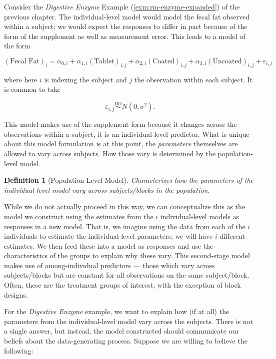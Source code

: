 \documentclass[
]{book}
\theoremstyle{plain}
\theoremstyle{mydefn}
\newtheorem{definition}{Definition}[chapter]
\theoremstyle{myexmpl}
\theoremstyle{remark}
\begin{document}
Consider the \emph{Digestive Enzyme} Example (\ref{exm:rm-enzyme-expanded}) of the previous chapter. The individual-level model would model the fecal fat observed within a subject; we would expect the responses to differ in part because of the form of the supplement as well as measurement error. This leads to a model of the form

\[(\text{Fecal Fat})_i = \alpha_{0,i} + \alpha_{1,i} (\text{Tablet})_{i,j} + \alpha_{2,i} (\text{Coated})_{i,j} + \alpha_{3,i} (\text{Uncoated})_{i,j} + \varepsilon_{i,j}\]

where here \(i\) is indexing the subject and \(j\) the observation within each subject. It is common to take

\[\varepsilon_{i,j} \stackrel{\text{IID}}{\sim}N\left(0, \sigma^2\right).\]

This model makes use of the supplement form because it changes across the observations within a subject; it is an individual-level predictor. What is unique about this model formulation is at this point, the \emph{parameters} themselves are allowed to vary across subjects. How those vary is determined by the population-level model.

\begin{definition}[Population-Level Model]
Characterizes how the \emph{parameters} of the individual-level model vary across subjects/blocks in the population.
\end{definition}

While we do not actually proceed in this way, we can conceptualize this as the model we construct using the estimates from the \(i\) individual-level models as responses in a new model. That is, we imagine using the data from each of the \(i\) individuals to estimate the individual-level parameters; we will have \(i\) different estimates. We then feed these into a model as responses and use the characteristics of the groups to explain why these vary. This second-stage model makes use of among-individual predictors --- those which vary across subjects/blocks but are constant for all observations on the same subject/block. Often, these are the treatment groups of interest, with the exception of block designs.

For the \emph{Digestive Enzyme} example, we want to explain how (if at all) the parameters from the individual-level model vary across the subjects. There is not a single answer, but instead, the model constructed should communicate our beliefs about the data-generating process. Suppose we are willing to believe the following:
\end{document}
